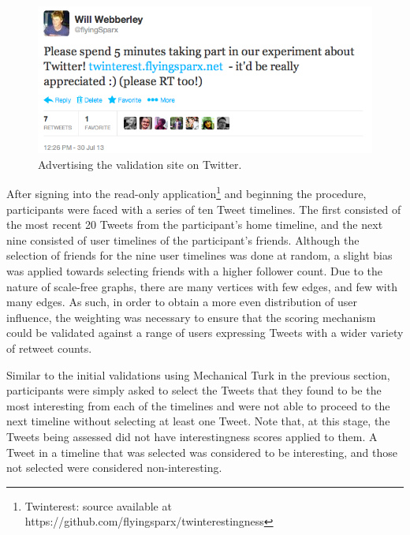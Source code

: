 \begin{figure}[h]
\centering
\includegraphics[scale=0.5]{5.Chapter3/Media/organic_advertising.png} 
\caption{Advertising the validation site on Twitter.}
\label{fig:organic_advertising}
\end{figure}

After signing into the read-only application\footnote{Twinterest: source available at https://github.com/flyingsparx/twinterestingness} and beginning the procedure, participants were faced with a series of ten Tweet timelines. The first consisted of the most recent 20 Tweets from the participant's home timeline, and the next nine consisted of user timelines of the participant's friends. Although the selection of friends for the nine user timelines was done at random, a slight bias was applied towards selecting friends with a higher follower count. Due to the nature of scale-free graphs, there are many vertices with few edges, and few with many edges. As such, in order to obtain a more even distribution of user influence, the weighting was necessary to ensure that the scoring mechanism could be validated against a range of users expressing Tweets with a wider variety of retweet counts.

Similar to the initial validations using Mechanical Turk in the previous section, participants were simply asked to select the Tweets that they found to be the most interesting from each of the timelines and were not able to proceed to the next timeline without selecting at least one Tweet. Note that, at this stage, the Tweets being assessed did not have interestingness scores applied to them. A Tweet in a timeline that was selected was considered to be interesting, and those not selected were considered non-interesting.



